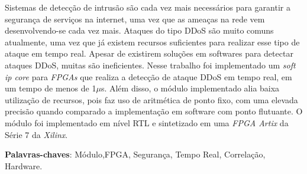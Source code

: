 \setlength{\absparsep}{18pt} %
\begin{resumo}[RESUMO]
      
      Sistemas de detecção de intrusão são cada vez mais necessários para garantir a segurança de  serviços na internet, uma vez que as ameaças na rede vem desenvolvendo-se cada vez mais. Ataques do tipo DDoS são muito comuns atualmente, uma vez que já existem recursos suficientes para realizar esse tipo de ataque em tempo real. Apesar de existirem soluções em softwares para detectar ataques DDoS, muitas são ineficientes. Nesse trabalho foi implementado um \textit{soft ip core} para \textit{FPGAs} que realiza a detecção de ataque DDoS em tempo real, em um tempo de menos de 1$\mu$s. Além disso, o módulo implementado  alia baixa utilização de recursos, pois faz uso de aritmética de ponto fixo, com uma elevada precisão quando comparado a implementação em software com ponto flutuante. O módulo foi implementado em nível RTL e sintetizado em uma \textit{FPGA Artix} da Série 7 da \textit{Xilinx}. 
      
      
\textbf{Palavras-chaves}: Módulo,FPGA, Segurança, Tempo Real, Correlação, Hardware.
\end{resumo}
